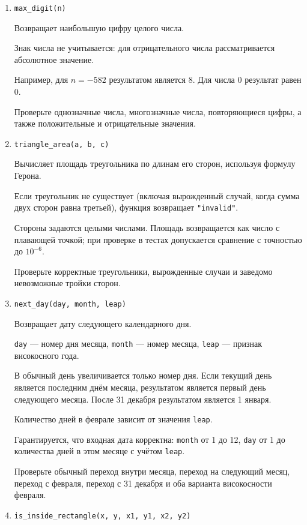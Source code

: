 \begin{enumerate}
Проверьте все три возможных случая независимо от того, какая именно
пара значений совпадает.

\item \texttt{max\_digit(n)}

Возвращает наибольшую цифру целого числа.

Знак числа не учитывается: для отрицательного числа рассматривается
абсолютное значение.

Например, для $n=-582$ результатом является $8$.
Для числа $0$ результат равен $0$.

Проверьте однозначные числа, многозначные числа, повторяющиеся цифры,
а также положительные и отрицательные значения.

\item \texttt{triangle\_area(a, b, c)}

Вычисляет площадь треугольника по длинам его сторон, используя формулу
Герона.

Если треугольник не существует (включая вырожденный случай, когда сумма
двух сторон равна третьей), функция возвращает \texttt{"invalid"}.

Стороны задаются целыми числами. Площадь возвращается как число
с плавающей точкой; при проверке в тестах допускается сравнение
с точностью до $10^{-6}$.

Проверьте корректные треугольники, вырожденные случаи и заведомо
невозможные тройки сторон.

\item \texttt{next\_day(day, month, leap)}

Возвращает дату следующего календарного дня.

\texttt{day} --- номер дня месяца, \texttt{month} --- номер месяца,
\texttt{leap} --- признак високосного года.

В обычный день увеличивается только номер дня.
Если текущий день является последним днём месяца, результатом является
первый день следующего месяца.
После 31 декабря результатом является 1 января.

Количество дней в феврале зависит от значения \texttt{leap}.

Гарантируется, что входная дата корректна: \texttt{month} от 1 до 12,
\texttt{day} от 1 до количества дней в этом месяце с учётом \texttt{leap}.

Проверьте обычный переход внутри месяца, переход на следующий месяц,
переход с февраля, переход с 31 декабря и оба варианта високосности
февраля.

\item \texttt{is\_inside\_rectangle(x, y, x1, y1, x2, y2)}


\end{enumerate}

